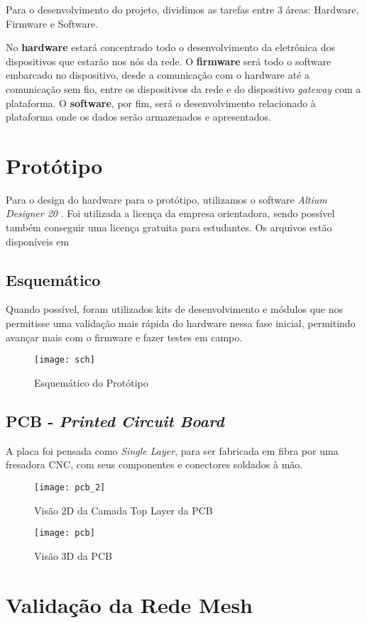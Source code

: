 \documentclass[../monografia.tex]{subfiles}
\begin{document}
Para o desenvolvimento do projeto, dividimos as tarefas entre 3 áreas: Hardware, Firmware e Software. 

No \textbf{hardware} estará concentrado todo o desenvolvimento da eletrônica dos dispositivos que estarão nos nós da rede. 
O \textbf{firmware} será todo o software embarcado no dispositivo, desde a comunicação com o hardware até a comunicação sem fio, entre os dispositivos da rede e do dispositivo \textit{gateway} com a plataforma. 
O \textbf{software}, por fim, será o desenvolvimento relacionado à plataforma onde os dados serão armazenados e apresentados. 

\section{Protótipo}

Para o design do hardware para o protótipo, utilizamos o software \textit{Altium Designer 20} \cite{altium}. Foi utilizada a licença da empresa orientadora, sendo possível também conseguir uma licença gratuita para estudantes. Os arquivos estão disponíveis em \cite{git_hw}

\subsection{Esquemático}

Quando possível, foram utilizados kits de desenvolvimento e módulos que nos permitisse uma validação mais rápida do hardware nessa fase inicial, permitindo avançar mais com o firmware e fazer testes em campo. 

\begin{figure}
\texttt{[image: sch]}
\label{fig:img1}
\caption{Esquemático do Protótipo}
\end{figure}

\subsection{PCB - \textit{Printed Circuit Board}}

A placa foi pensada como \textit{Single Layer}, para ser fabricada em fibra por uma fresadora CNC, com seus componentes e conectores soldados à mão. 

\begin{figure}
\centering
\texttt{[image: pcb\_2]}
\label{fig:img2}
\caption{Visão 2D da Camada Top Layer da PCB}
\end{figure}

\begin{figure}
\centering
\texttt{[image: pcb]}
\label{fig:img3}
\caption{Visão 3D da PCB}
\end{figure}

\section{Validação da Rede Mesh}
\end{document}
